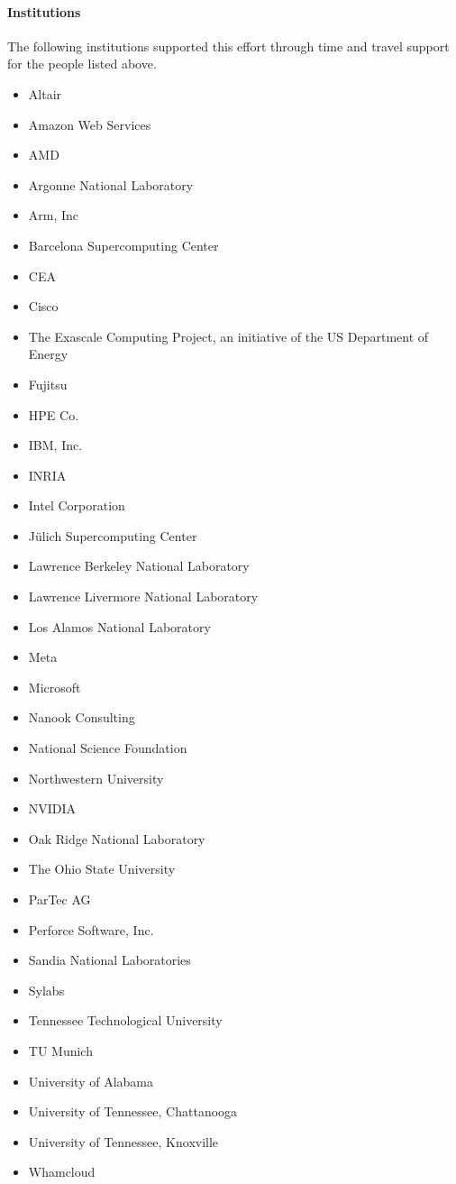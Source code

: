 \paragraph*{Institutions}

The following institutions supported this effort through time and travel support for the people listed above.

\begin{itemize}
    \item Altair
    \item Amazon Web Services
    \item AMD
    \item Argonne National Laboratory
    \item Arm, Inc
    \item Barcelona Supercomputing Center
    \item CEA
    \item Cisco
    \item The Exascale Computing Project, an initiative of the US Department of Energy
    \item Fujitsu
    \item HPE Co.
    \item IBM, Inc.
    \item INRIA
    \item Intel Corporation
    \item Jülich Supercomputing Center
    \item Lawrence Berkeley National Laboratory
    \item Lawrence Livermore National Laboratory
    \item Los Alamos National Laboratory
    \item Meta
    \item Microsoft
    \item Nanook Consulting
    \item National Science Foundation
    \item Northwestern University
    \item NVIDIA
    \item Oak Ridge National Laboratory
    \item The Ohio State University
    \item ParTec AG
    \item Perforce Software, Inc.
    \item Sandia National Laboratories
    \item Sylabs
    \item Tennessee Technological University
    \item TU Munich
    \item University of Alabama
    \item University of Tennessee, Chattanooga
    \item University of Tennessee, Knoxville
    \item Whamcloud
\end{itemize}


